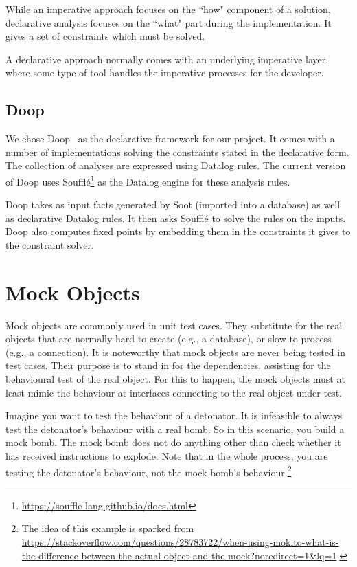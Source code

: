 While an imperative approach focuses on the ``how" component of a solution, declarative analysis focuses on the ``what" part during the implementation. It gives a set of constraints which must be solved.

A declarative approach normally comes with an underlying imperative layer, where some type of tool handles the imperative processes for the developer.

\subsection{Doop}

We chose Doop~\cite{bravenboer09:_stric_declar_specif_sophis_point_analy} as the declarative framework for our project. It comes with a number of implementations solving the constraints stated in the declarative form. The collection of analyses are expressed using Datalog rules. The current version of Doop uses Soufflé\footnote{\url{https://souffle-lang.github.io/docs.html}} as the Datalog engine for these analysis rules.

Doop takes as input facts generated by Soot (imported into a database) as well as declarative Datalog rules. It then asks Soufflé to solve the rules on the inputs. Doop also computes fixed points by embedding them in the constraints it gives to the constraint solver.


\section{Mock Objects} 

Mock objects are commonly used in unit test cases. They substitute for the real objects that are normally hard to create (e.g., a database), or slow to process (e.g., a connection). It is noteworthy that mock objects are never being tested in test cases. Their purpose is to stand in for the dependencies, assisting for the behavioural test of the real object. For this to happen, the mock objects must at least mimic the behaviour at interfaces connecting to the real object under test.

Imagine you want to test the behaviour of a detonator. It is infeasible to always test the detonator's behaviour with a real bomb. So in this scenario, you build a mock bomb. The mock bomb does not do anything other than check whether it has received instructions to explode. Note that in the whole process, you are testing the detonator's behaviour, not the mock bomb's behaviour.\footnote{The idea of this example is sparked from \url{https://stackoverflow.com/questions/28783722/when-using-mokito-what-is-the-difference-between-the-actual-object-and-the-mock?noredirect=1&lq=1}.}

